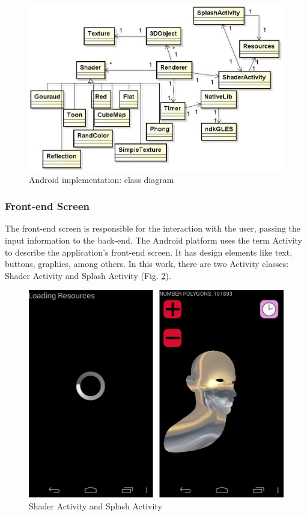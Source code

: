 \documentclass[10pt, conference, compsocconf]{IEEEtran}
\begin{document}
{	\begin{figure}[!t]
	\centering
	\includegraphics[keepaspectratio=true,scale=0.32]{class_diagram.jpg}
	\caption{Android implementation: class diagram}
	\label{class_diagram}
	\end{figure}

\subsubsection{Front-end Screen}

The front-end screen is responsible for the interaction with the user, 
passing the input information to the back-end. The Android platform
uses the term Activity to describe the application's front-end screen. It has 
design elements like text, buttons, graphics, among others. In this work,
there are two Activity classes: Shader Activity and Splash Activity (Fig. \ref{shader_splash}).

	\begin{figure}[!t]
	\centering
		\includegraphics[keepaspectratio=true,scale=0.12]{shader_splash.png}
	\caption{Shader Activity and Splash Activity}
	\label{shader_splash}
	\end{figure}
	
}
\end{document}
